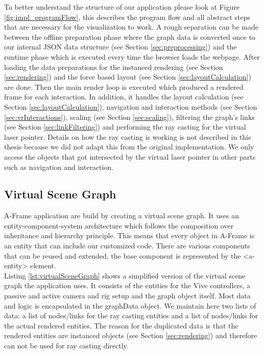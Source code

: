 To better understand the structure of our application please look at Figure \ref{fig:impl_programFlow}, this describes the program flow and all abstract steps that are necessary for the visualization to work.
A rough separation can be made between the offline preparation phase where the graph data is converted once to our internal JSON data structure (see Section \ref{sec:preprocessing}) and the runtime phase which is executed every time the browser loads the webpage.
After loading the data preparations for the instanced rendering (see Section \ref{sec:rendering}) and the force based layout (see Section \ref{sec:layoutCalculation}) are done.
Then the main render loop is executed which produced a rendered frame for each interaction. In addition, it handles the layout calculation (see Section \ref{sec:layoutCalculation}), navigation and interaction methods (see Section \ref{sec:vrInteractions}), scaling (see Section \ref{sec:scaling}), filtering the graph's links (see Section \ref{sec:linkFiltering}) and performing the ray casting for the virtual laser pointer.
Details on how the ray casting is working is not described in this thesis because we did not adapt this from the original implementation. We only access the objects that got intersected by the virtual laser pointer in other parts such as navigation and interaction. 

\subsection{Virtual Scene Graph}
A-Frame application are build by creating a virtual scene graph.
It uses an entity-component-system architecture which follows the  composition over inheritance and hierarchy principle. 
This means that every object in A-Frame is an entity that can include our customized code.
There are various components that can be reused and extended, the base  component is represented by the <a-entity> element.\\
Listing \ref{lst:virtualSceneGraph} shows a simplified version of the virtual scene graph the application uses. 
It consists of the entities for the Vive controllers, a passive and active camera and rig setup and the graph object itself.
Most data and logic is encapsulated in the graphData object. We maintain here two lists of data: a list of nodes/links for the ray casting entities and a list of nodes/links for the actual rendered entities. The reason for the duplicated data is that the rendered entities are instanced objects (see Section \ref{sec:rendering}) and therefore can not be used for ray casting directly.

